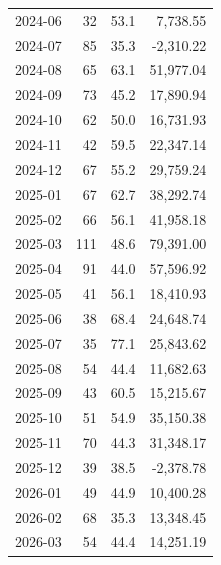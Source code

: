 \documentclass[11pt,a4paper,twoside]{article}
\begin{document}
\begin{center}
\begin{tabular}{>{\color{txtmain}}l rrr}
2024-06 & 32 & 53.1 & \textcolor{wingreen}{7,738.55} \\
2024-07 & 85 & 35.3 & \textcolor{lossred}{-2,310.22} \\
2024-08 & 65 & 63.1 & \textcolor{wingreen}{51,977.04} \\
2024-09 & 73 & 45.2 & \textcolor{wingreen}{17,890.94} \\
2024-10 & 62 & 50.0 & \textcolor{wingreen}{16,731.93} \\
2024-11 & 42 & 59.5 & \textcolor{wingreen}{22,347.14} \\
2024-12 & 67 & 55.2 & \textcolor{wingreen}{29,759.24} \\
2025-01 & 67 & 62.7 & \textcolor{wingreen}{38,292.74} \\
2025-02 & 66 & 56.1 & \textcolor{wingreen}{41,958.18} \\
2025-03 & 111 & 48.6 & \textcolor{wingreen}{79,391.00} \\
2025-04 & 91 & 44.0 & \textcolor{wingreen}{57,596.92} \\
2025-05 & 41 & 56.1 & \textcolor{wingreen}{18,410.93} \\
2025-06 & 38 & 68.4 & \textcolor{wingreen}{24,648.74} \\
2025-07 & 35 & 77.1 & \textcolor{wingreen}{25,843.62} \\
2025-08 & 54 & 44.4 & \textcolor{wingreen}{11,682.63} \\
2025-09 & 43 & 60.5 & \textcolor{wingreen}{15,215.67} \\
2025-10 & 51 & 54.9 & \textcolor{wingreen}{35,150.38} \\
2025-11 & 70 & 44.3 & \textcolor{wingreen}{31,348.17} \\
2025-12 & 39 & 38.5 & \textcolor{lossred}{-2,378.78} \\
2026-01 & 49 & 44.9 & \textcolor{wingreen}{10,400.28} \\
2026-02 & 68 & 35.3 & \textcolor{wingreen}{13,348.45} \\
2026-03 & 54 & 44.4 & \textcolor{wingreen}{14,251.19} \\
\bottomrule
\end{tabular}
\end{center}
\end{document}
